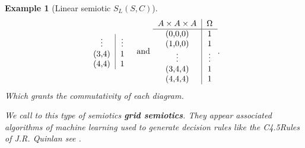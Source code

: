 \documentclass[oribibl]{llncs}
\newtheorem{exam}{Example}
\begin{document}
\begin{exam}[Linear semiotic $S_L(S,C)$]
\[\begin{tabular}{c|c}
  $\vdots$ & $\vdots$ \\
  (3,4) & 1 \\
  (4,4) & 1 \\
\end{tabular}\;\;\text{ and }
\begin{tabular}{c|c}
  $A\times A\times A$ & $\Omega$ \\
  \hline
  (0,0,0) & 1 \\
  (1,0,0) & 1 \\
  $\vdots$ & $\vdots$ \\
  (3,4,4) & 1 \\
  (4,4,4) & 1 \\
\end{tabular}
.
\]
Which grants the commutativity of each diagram.

We call to this type of semiotics \textbf{grid semiotics}. They appear associated algorithms of machine learning used to generate decision rules  like the C4.5Rules of J.R. Quinlan see \cite{Michell86}.
\end{exam}
\end{document}
